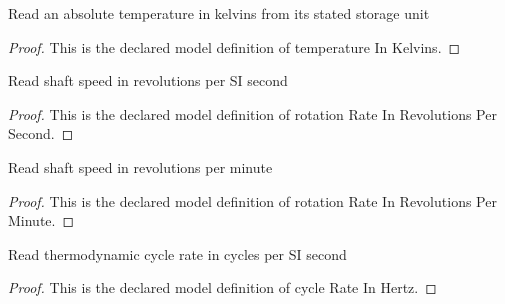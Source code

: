 \begin{definition}
  \label{def:physics:phyx-mini-0479:phyxminiproblems-problemphyxmini0479-temperatureinkelvins}
  Read an absolute temperature in kelvins from its stated storage unit
\end{definition}
\begin{proof}
  This is the declared model definition of temperature In Kelvins.
\end{proof}
\begin{definition}
  \label{def:physics:phyx-mini-0479:phyxminiproblems-problemphyxmini0479-rotationrateinrevolutionspersecond}
  Read shaft speed in revolutions per SI second
\end{definition}
\begin{proof}
  This is the declared model definition of rotation Rate In Revolutions Per Second.
\end{proof}
\begin{definition}
  \label{def:physics:phyx-mini-0479:phyxminiproblems-problemphyxmini0479-rotationrateinrevolutionsperminute}
  Read shaft speed in revolutions per minute
\end{definition}
\begin{proof}
  This is the declared model definition of rotation Rate In Revolutions Per Minute.
\end{proof}
\begin{definition}
  \label{def:physics:phyx-mini-0479:phyxminiproblems-problemphyxmini0479-cyclerateinhertz}
  Read thermodynamic cycle rate in cycles per SI second
\end{definition}
\begin{proof}
  This is the declared model definition of cycle Rate In Hertz.
\end{proof}
